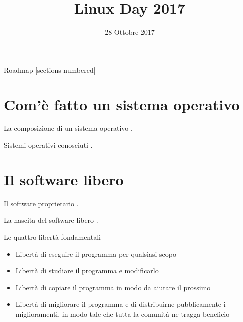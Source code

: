 \documentclass[10pt]{beamer}
\title{Linux Day 2017}
\subtitle{}
\date{28 Ottobre 2017}
\author{}
\institute{Latina Linux User Group}
\begin{document}

\maketitle

\begin{frame}{Roadmap}
  [sections numbered]
  \tableofcontents[hideallsubsections]
\end{frame}


\section{Com'è fatto un sistema operativo}

\begin{frame}{La composizione di un sistema operativo}
.
\end{frame}

\begin{frame}{Sistemi operativi conosciuti}
.
\end{frame}


\section{Il software libero}

\begin{frame}[fragile]{Il software proprietario}
.
\end{frame}

\begin{frame}[fragile]{La nascita del software libero}
.
\end{frame}

\begin{frame}[fragile]{Le quattro libertà fondamentali}

\begin{itemize}
\item Libertà di eseguire il programma per qualsiasi scopo
\item \pause Libertà di studiare il programma e modificarlo
\item \pause Libertà di copiare il programma in modo da aiutare il prossimo
\item \pause Libertà di migliorare il programma e di distribuirne pubblicamente i miglioramenti, in modo tale che tutta la comunità ne tragga beneficio
\end{itemize}

\end{frame}
\end{document}
